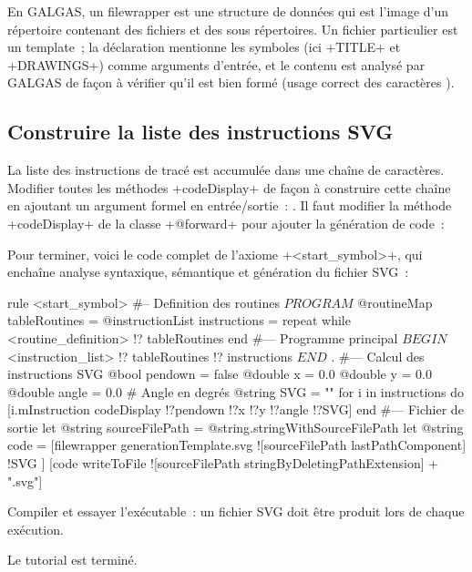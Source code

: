 En GALGAS, un filewrapper est une structure de données qui est l'image d'un répertoire contenant des fichiers et des sous répertoires. Un fichier particulier est un template~; la déclaration mentionne les symboles (ici \ggs+TITLE+ et \ggs+DRAWINGS+) comme arguments d'entrée, et le contenu est analysé par GALGAS de façon à vérifier qu'il est bien formé (usage correct des caractères \tpp{\%}).

\subsection{Construire la liste des instructions SVG}
La liste des instructions de tracé est accumulée dans une chaîne de caractères. Modifier toutes les méthodes \ggs+codeDisplay+ de façon à construire cette chaîne en ajoutant un argument formel en entrée/sortie~: . Il faut modifier la méthode \ggs+codeDisplay+ de la classe \ggs+@forward+ pour ajouter la génération de code~:


Pour terminer, voici le code complet de l’axiome \ggs+<start_symbol>+, qui enchaîne analyse syntaxique, sémantique et génération du fichier SVG~:
\begin{galgas}
rule <start_symbol> {
#-- Definition des routines
  $PROGRAM$
  @routineMap tableRoutines = {}
  @instructionList instructions = {}
  repeat
  while
    <routine_definition> !? tableRoutines
  end
#--- Programme principal
  $BEGIN$
  <instruction_list> !? tableRoutines !? instructions
  $END$
  $.$
#--- Calcul des instructions SVG
  @bool pendown = false
  @double x = 0.0
  @double y = 0.0
  @double angle = 0.0 # Angle en degrés
  @string SVG = ""
  for i in instructions do
    [i.mInstruction codeDisplay !?pendown !?x !?y !?angle !?SVG]
  end
#--- Fichier de sortie
  let @string sourceFilePath = @string.stringWithSourceFilePath
  let @string code = [filewrapper generationTemplate.svg
    ![sourceFilePath lastPathComponent]
    !SVG
  ]
  [code writeToFile ![sourceFilePath stringByDeletingPathExtension] + ".svg"]
}
\end{galgas}

Compiler et essayer l'exécutable~: un fichier SVG doit être produit lors de chaque exécution.

Le tutorial est terminé.
